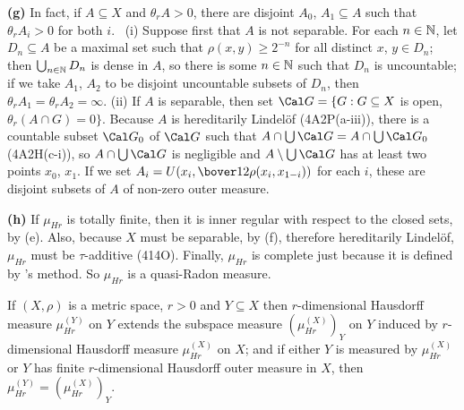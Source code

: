 {{\bf (g)} In fact, if $A\subseteq X$ and $\theta_rA>0$, there are
disjoint $A_0$, $A_1\subseteq A$ such that $\theta_rA_i>0$ for both $i$.
\Prf\ (i) Suppose first that $A$ is not separable.   For each
$n\in\Bbb N$, let $D_n\subseteq A$ be a maximal set such that
$\rho(x,y)\ge 2^{-n}$ for all distinct $x$, $y\in D_n$;  then
$\bigcup_{n\in\Bbb N}D_n$ is dense in $A$, so there is some $n\in\Bbb N$
such that $D_n$ is uncountable;  if we take $A_1$, $A_2$ to be disjoint
uncountable subsets of $D_n$, then $\theta_rA_1=\theta_rA_2=\infty$.
(ii) If $A$ is separable, then set $\Cal G=\{G:G\subseteq X$ is open,
$\theta_r(A\cap G)=0\}$.   Because $A$ is hereditarily Lindel\"of
(4A2P(a-iii)), there is a countable subset $\Cal G_0$ of $\Cal G$ such
that $A\cap\bigcup\Cal G=A\cap\bigcup\Cal G_0$ (4A2H(c-i)), so
$A\cap\bigcup\Cal G$ is negligible and $A\setminus\bigcup\Cal G$ has at
least two points $x_0$, $x_1$.   If we set
$A_i=U(x_i,\bover12\rho(x_i,x_{1-i}))$ for each $i$, these are disjoint
subsets of $A$ of non-zero outer measure.\ \Qed

\medskip

{\bf (h)} If $\mu_{Hr}$ is totally finite, then it is inner regular with
respect to the closed sets, by (e).   Also, because $X$ must be
separable, by (f), therefore hereditarily Lindel\"of, $\mu_{Hr}$ must be
$\tau$-additive (414O).   Finally, $\mu_{Hr}$ is complete just
because it is defined by \Caratheodory's method.   So $\mu_{Hr}$ is a
quasi-Radon measure.
}%

 If $(X,\rho)$ is a metric space, $r>0$ and
$Y\subseteq X$ then $r$-dimensional Hausdorff measure $\mu^{(Y)}_{Hr}$
on $Y$ extends the subspace measure $(\mu^{(X)}_{Hr})_Y$ on $Y$ induced
by $r$-dimensional Hausdorff measure $\mu^{(X)}_{Hr}$ on $X$;  and if
either $Y$ is measured by $\mu^{(X)}_{Hr}$ or $Y$ has finite
$r$-dimensional Hausdorff outer measure in $X$, then
$\mu^{(Y)}_{Hr}=(\mu^{(X)}_{Hr})_Y$.


